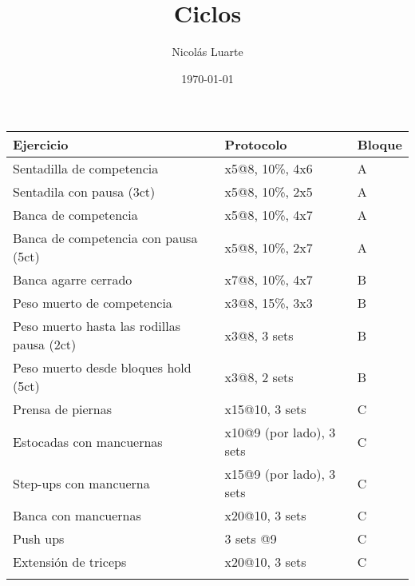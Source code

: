 \documentclass[11pt]{article}
\author{Nicolás Luarte}
\date{\today}
\title{Ciclos}
\begin{document}
\maketitle
\tableofcontents

\begin{center}
\begin{tabular}{lll}
Ejercicio & Protocolo & Bloque\\
\hline
Sentadilla de competencia & x5@8, 10\%, 4x6 & A\\
Sentadila con pausa (3ct) & x5@8, 10\%, 2x5 & A\\
Banca de competencia & x5@8, 10\%, 4x7 & A\\
Banca de competencia con pausa (5ct) & x5@8, 10\%, 2x7 & A\\
\hline
Banca agarre cerrado & x7@8, 10\%, 4x7 & B\\
Peso muerto de competencia & x3@8, 15\%, 3x3 & B\\
Peso muerto hasta las rodillas pausa (2ct) & x3@8, 3 sets & B\\
Peso muerto desde bloques hold (5ct) & x3@8, 2 sets & B\\
\hline
Prensa de piernas & x15@10, 3 sets & C\\
Estocadas con mancuernas & x10@9 (por lado), 3 sets & C\\
Step-ups con mancuerna & x15@9 (por lado), 3 sets & C\\
Banca con mancuernas & x20@10, 3 sets & C\\
Push ups & 3 sets @9 & C\\
Extensión de triceps & x20@10, 3 sets & C\\
 &  & \\
\end{tabular}
\end{center}
\end{document}
